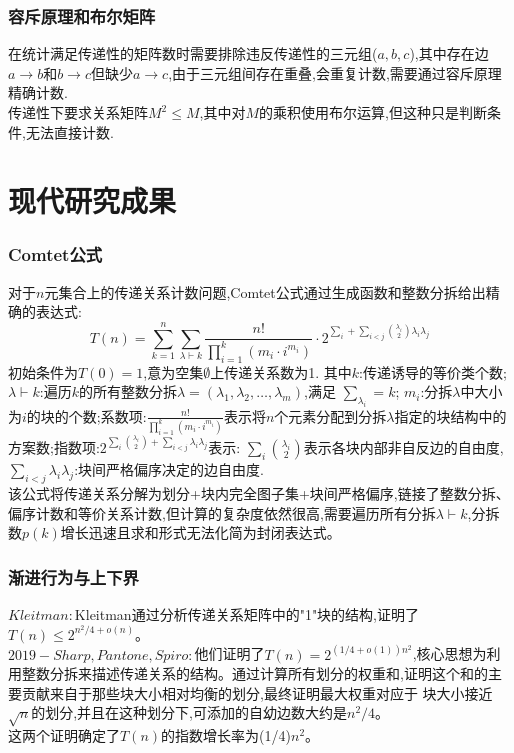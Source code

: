 \documentclass[12pt]{article}
\theoremstyle{definition}
\begin{document}
\subsubsection{容斥原理和布尔矩阵}
在统计满足传递性的矩阵数时需要排除违反传递性的三元组($a,b,c$),其中存在边$a\rightarrow b$和$b \rightarrow c$但缺少$a \rightarrow c$,由于三元组间存在重叠,会重复计数,需要通过容斥原理精确计数.\\
\hspace*{2em}传递性下要求关系矩阵$M^2$$\leq$$M$,其中对$M$的乘积使用布尔运算,但这种只是判断条件,无法直接计数.
\section{现代研究成果}
\subsubsection{Comtet公式}
对于$n$元集合上的传递关系计数问题,Comtet公式通过生成函数和整数分拆给出精确的表达式:
\[
 T(n)=\sum_{k=1}^{n}\sum_{\lambda \vdash k}^{}\frac{n!}{ {\textstyle \prod_{i=1}^{k}}(m_{i}\cdot i^{m_{i}}) }\cdot 2^{ {\textstyle \sum_{i}^{}} + {\textstyle \sum_{i<j}^{} \binom{\lambda_{i}}{2}\lambda_{i}\lambda_{j}} }
\]
初始条件为$T(0)=1$,意为空集$\emptyset$上传递关系数为1.
其中$k$:传递诱导的等价类个数;$\lambda \vdash k$:遍历$k$的所有整数分拆$\lambda = (\lambda_{1},\lambda_{2},\dots ,\lambda_{m})$,满足 ${\textstyle \sum_{\lambda_{i}}^{}}=k$;
$m_i$:分拆$\lambda$中大小为$i$的块的个数;系数项:$\frac{n!}{{\textstyle \prod_{i=1}^{k}}(m_{i}\cdot i^{m_{i}})}$表示将$n$个元素分配到分拆$\lambda$指定的块结构中的方案数;指数项:$2^{\textstyle \sum_{i}^{}\binom{\lambda_{i}}{2}+\textstyle \sum_{i<j}^{}\lambda_{i}\lambda_{j} }$表示:
$\textstyle \sum_{i}^{}\binom{\lambda_{i}}{2}$表示各块内部非自反边的自由度,$\textstyle \sum_{i<j}^{}\lambda_{i}\lambda_{j}$:块间严格偏序决定的边自由度.
\\
\hspace*{2em}该公式将传递关系分解为划分+块内完全图子集+块间严格偏序,链接了整数分拆、偏序计数和等价关系计数,但计算的复杂度依然很高,需要遍历所有分拆$\lambda \vdash k$,分拆数$p(k)$增长迅速且求和形式无法化简为封闭表达式。
\subsubsection{渐进行为与上下界}
$Kleitman:$Kleitman通过分析传递关系矩阵中的"1"块的结构,证明了$T(n)\leq 2^{n^2/4+o(n)}$。\\
\hspace*{2em}$2019-Sharp,Pantone,Spiro:$他们证明了$T(n)=2^{(1/4+o(1))n^2}$,核心思想为利用整数分拆来描述传递关系的结构。通过计算所有划分的权重和,证明这个和的主要贡献来自于那些块大小相对均衡的划分,最终证明最大权重对应于
块大小接近$\sqrt{n}$的划分,并且在这种划分下,可添加的自幼边数大约是$n^{2}/4$。\\
\hspace*{2em}这两个证明确定了$T(n)$的指数增长率为(1/4)$n^2$。
\end{document}

